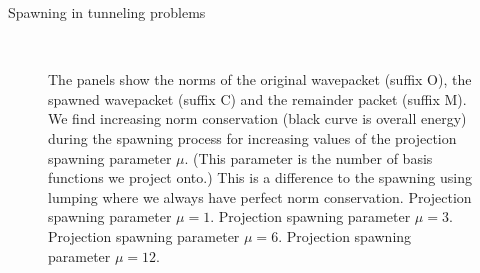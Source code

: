 \begin{chapter}{Spawning in tunneling problems}
\begin{figure}[h!]
{  } \\
  \caption[Norms of the original and spawned wavepackets using the projection spawning method]{
  The panels show the norms of the original wavepacket (suffix O), the spawned
  wavepacket (suffix C) and the remainder packet (suffix M).
  We find increasing norm conservation (black curve is overall energy) during the spawning
  process for increasing values of the projection spawning parameter $\mu$.
  (This parameter is the number of basis functions we project onto.)
  This is a difference to the spawning using lumping where we always have perfect
  norm conservation.
   Projection spawning parameter $\mu = 1$.
   Projection spawning parameter $\mu = 3$.
   Projection spawning parameter $\mu = 6$.
   Projection spawning parameter $\mu = 12$.
  \label{fig:tunnel_spawn_project_K50_spawn_norms}
  }
\end{figure}



\end{chapter}
